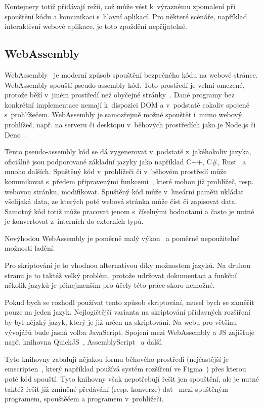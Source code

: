Kontejnery totiž přidávají režii, což může vést k~výraznému zpomalení při spouštění kódu a komunikaci s~hlavní aplikací. 
Pro některé scénáře, například interaktivní webové aplikace, je toto zpoždění nepřijatelné.

\subsection{WebAssembly}\label{text:webassembly}

WebAssembly~\cite{webassembly} je moderní způsob spouštění bezpečného kódu na webové stránce.
WebAssembly spouští pseudo-assembly kód.
Toto prostředí je velmi omezené, protože běží v~jiném prostředí než obyčejné stránky~\cite{webassembly, figma_plugins_blog}.
Dané programy bez konkrétní implementace nemají k~dispozici DOM a v~podstatě cokoliv spojené s~prohlížečem.
WebAssembly je samozřejmě možné spouštět i~mimo webový prohlížeč, např. na serveru či desktopu v~běhových prostředích jako je Node.js či Deno~\cite{webassembly}.

Tento pseudo-assembly kód se dá vygenerovat v~podstatě z~jakéhokoliv jazyka, oficiálně jsou podporované základní jazyky jako například C++, C\#, Rust~\cite{webassembly} a mnoho dalších.
Spuštěný kód v~prohlížeči či v~běhovém prostředí může komunikovat s~předem připravenými funkcemi~\cite{webassembly}, které mohou již prohlížeč, resp. webovou stránku, modifikovat.
Spuštěný kód může v~lineární paměti ukládat všelijaká data, ze kterých poté webová stránka může číst či zapisovat data.
Samotný kód totiž může pracovat jenom s~číselnými hodnotami a často je nutné je konvertovat z~interních do externích typů.

Nevýhodou WebAssembly je poměrně malý výkon~\cite{webassembly, figma_plugins_blog} a poměrně nepoužitelné možnosti ladění.

Pro skriptování je to vhodnou alternativou díky možnostem jazyků. 
Na druhou stranu je to taktéž velký problém, protože udržovat dokumentaci a funkční několik jazyků je přinejmenším pro účely této práce skoro nemožné.

Pokud bych se rozhodl používat tento způsob skriptování, musel bych se zaměřit pouze na jeden jazyk.
Nejlogičtější varianta na skriptování přídavných rozšíření by byl nějaký jazyk, který je již určen na skriptování.
Na webu pro většinu vývojářů bude jasná volba JavaScript.
Spojení mezi WebAssembly a JS zajišťuje např. knihovna QuickJS~\cite{quickjs}, AssemblyScript~\cite{assemblyscript} a další.

Tyto knihovny zabalují nějakou formu běhového prostředí (nejčastější je emscripten~\cite{assemblyscript, quickjs, figma_plugins_blog}, který například používá systém rozšíření ve Figma~\cite{figma_plugins_blog}) přes kterou poté kód spouští.
Tyto knihovny však nepotřebují řešit jen spouštění, ale je nutné taktéž řešit již zmíněné předávání (resp. konverze) dat~\cite{assemblyscript} mezi spuštěným programem, spouštěčem a programem v~prohlížeči.

